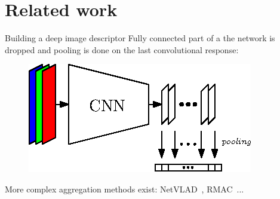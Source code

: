 \section{Related work}

\label{sec:related_work}

\begin{frame}{Building a deep image descriptor}
	Fully connected part of a the network is dropped and pooling is done on the last convolutional response:
	\vfill
	\begin{figure}
		\centering
		\includegraphics[width=0.8\linewidth]{vect/MAC.eps}			
	\end{figure}
	\vfill
	More complex aggregation methods exist: NetVLAD~\cite{Arandjelovic2017}, RMAC~\cite{Radenovic2016}...
\end{frame}

